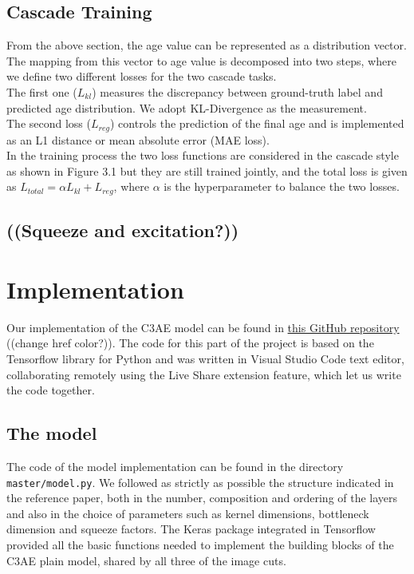 \subsection*{Cascade Training}
From the above section, the age value can be represented as a distribution vector. The mapping from this 
vector to age value is decomposed into two steps, where we define two different losses for the two cascade 
tasks.\\
The first one ($L_{kl}$) measures the discrepancy between ground-truth label and predicted age distribution.
We adopt KL-Divergence as the measurement.\\
The second loss ($L_{reg}$) controls the prediction of the final age and is implemented as an L1 distance
or mean absolute error (MAE loss).\\
In the training process the two loss functions are considered in the cascade style as shown in Figure 3.1 
but they are still trained jointly, and the total loss is given as
$L_{total} = \alpha L_{kl} + L_{reg}$, where $\alpha$ is the hyperparameter to balance the two losses.

\subsection*{((Squeeze and excitation?))}

\section{Implementation}
Our implementation of the C3AE model can be found in 
\href{https://github.com/torchipeppo/NN-project}{this GitHub repository} ((change href color?)).
The code for this part of the project is based on the Tensorflow library for Python and was written in 
Visual Studio Code text editor, collaborating remotely using the Live Share extension feature, which let 
us write the code together.
\subsection*{The model}
The code of the model implementation can be found in the directory \texttt{master/model.py}. We followed 
as strictly as possible the structure indicated in the reference paper, both in the number, composition 
and ordering of the layers and also in the choice of parameters such as kernel dimensions, bottleneck
dimension and squeeze factors.
The Keras package integrated in Tensorflow provided all the basic functions needed to implement the
building blocks of the C3AE plain model, shared by all three of the image cuts.


